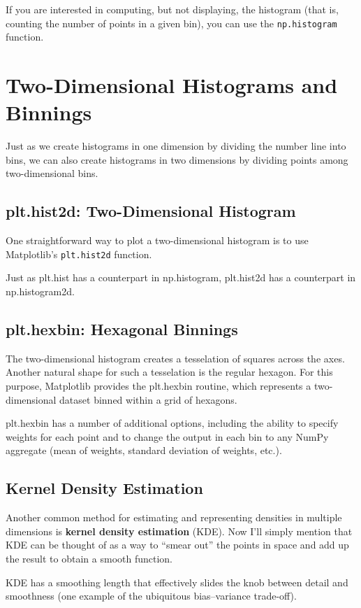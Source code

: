 
If you are interested in computing, but not displaying, the histogram (that is, counting the number of points in a given bin), you can use the \verb|np.histogram| function.

\section{Two-Dimensional Histograms and Binnings}
Just as we create histograms in one dimension by dividing the number line into bins,
we can also create histograms in two dimensions by dividing points among two-dimensional bins.

\subsection*{plt.hist2d: Two-Dimensional Histogram}
One straightforward way to plot a two-dimensional histogram is to use Matplotlib's
\verb|plt.hist2d| function.

Just as plt.hist has a counterpart in np.histogram, plt.hist2d has a counterpart in
np.histogram2d.

\subsection*{plt.hexbin: Hexagonal Binnings}
The two-dimensional histogram creates a tesselation of squares across the axes.
Another natural shape for such a tesselation is the regular hexagon. For this purpose,
Matplotlib provides the plt.hexbin routine, which represents a two-dimensional
dataset binned within a grid of hexagons.

plt.hexbin has a number of additional options, including the ability to specify
weights for each point and to change the output in each bin to any NumPy aggregate
(mean of weights, standard deviation of weights, etc.).

\subsection*{Kernel Density Estimation}
Another common method for estimating and representing densities in multiple
dimensions is \textbf{kernel density estimation} (KDE). Now I'll simply mention that KDE can be thought of as a way to
“smear out” the points in space and add up the result to obtain a smooth function.

KDE has a smoothing length that effectively slides the knob between detail and
smoothness (one example of the ubiquitous bias–variance trade-off).